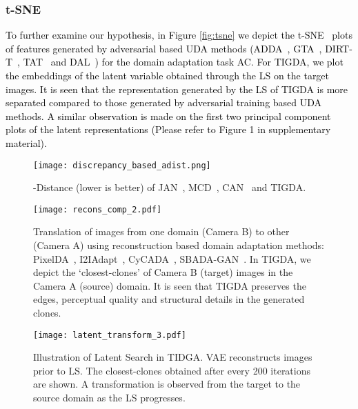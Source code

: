 \documentclass[journal,twoside,web]{IEEEtran}
\renewcommand{\textrightarrow}{}
\newcommand{\bb}{\textcolor{black}}
\begin{document}
\subsubsection{t-SNE}
\bb{To further examine our hypothesis, in Figure \ref{fig:tsne} we depict the t-SNE~\cite{maaten2008visualizing} 
plots of features generated by adversarial based UDA methods (ADDA~\cite{tzeng2017adversarial}, GTA~\cite{sankaranarayanan2018generate}, DIRT-T~\cite{shu2018dirt}, TAT~\cite{liu2019transferable} and DAL~\cite{peng2019domain}) for the domain adaptation task A\textrightarrow C. For TIGDA, we plot the embeddings of the latent variable  obtained through the LS on the target images. It is seen that the representation generated by the LS of TIGDA is more separated compared to those generated by adversarial training based UDA methods.} \bb{A similar observation is made on the first two principal component plots of the latent representations (Please refer to Figure 1 in supplementary material).}
\setlength{\textfloatsep}{0pt}
\begin{figure}
\texttt{[image: discrepancy\_based\_adist.png]}
\caption{-Distance (lower is better) of JAN~\cite{long2017deep}, MCD~\cite{saito2018maximum}, CAN~\cite{kang2019contrastive} and TIGDA.}
\label{fig:adist}
\end{figure}



\setlength{\textfloatsep}{0pt}
\begin{figure}
\centering
\texttt{[image: recons\_comp\_2.pdf]}
\caption{Translation of images from one domain (Camera B) to other (Camera A) using reconstruction based domain adaptation methods: PixelDA~\cite{bousmalis2017unsupervised}, I2IAdapt~\cite{murez2018image}, CyCADA~\cite{hoffman2017cycada}, SBADA-GAN~\cite{russo2018source}. In TIGDA, we depict the `closest-clones' of Camera B (target) images in the Camera A (source) domain. It is seen that TIGDA preserves the edges, perceptual quality and structural details in the generated clones. }
\label{fig:recons_comp}
\end{figure}
\setlength{\textfloatsep}{0pt}
\begin{figure}
\texttt{[image: latent\_transform\_3.pdf]}
\caption{Illustration of Latent Search in TIDGA. VAE reconstructs images prior to LS. The closest-clones obtained after every 200 iterations are shown. A transformation is observed from the target to the source domain as the LS progresses.}
\label{fig:transform}
\end{figure}
\setlength{\textfloatsep}{0pt}
\end{document}

